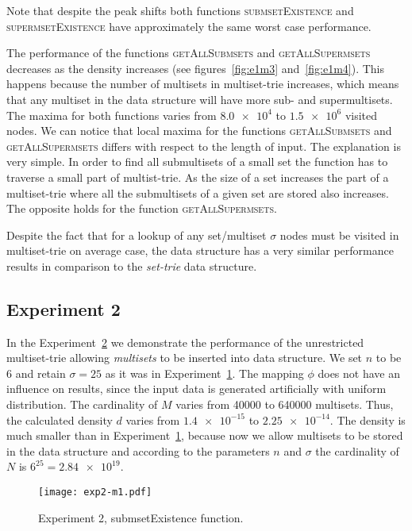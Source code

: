 Note that despite the peak shifts both functions \textsc{submsetExistence} and 
\textsc{supermsetExistence} have approximately the same worst case performance. 

The performance of the functions \textsc{getAllSubmsets} and \textsc{getAllSupermsets} 
decreases as the density increases (see figures~\ref{fig:e1m3} and~\ref{fig:e1m4}). 
This happens because the number of multisets in multiset-trie increases, which means 
that any multiset in the data structure will have more sub- and supermultisets. 
The maxima for both functions varies from $\num{8.0e4}$ to $\num{1.5e6}$ visited nodes. 
We can notice that local maxima for the functions \textsc{getAllSubmsets} and 
\textsc{getAllSupermsets} differs with respect to the length of input. The 
explanation is very simple. In order to find all submultisets of a small set the 
function has to traverse a small part of multist-trie. As the size of a set 
increases the part of a multiset-trie where all the submultisets of a given set 
are stored also increases. The opposite holds for the function 
\textsc{getAllSupermsets}.


Despite the fact that for a lookup of any set/multiset $\sigma$ nodes must be visited 
in multiset-trie on average case, the data structure has a very similar performance 
results in comparison to the \emph{set-trie} data structure.

\subsection{Experiment 2} \label{s:exp2}
In the Experiment~\hyperref[s:exp2]{2} we demonstrate the performance of 
the unrestricted multiset-trie allowing \emph{multisets} to be inserted into data structure. 
We set $n$ to be 6 and retain $\sigma = 25$ as it was in Experiment~\hyperref[s:exp1]{1}. 
The mapping $\phi$ does not have an influence on results, since the input 
data is generated artificially with uniform distribution. The cardinality of $M$ 
varies from 40000 to 640000 multisets. Thus, the calculated density $d$ varies 
from $\num{1.4e-15}$ to $\num{2.25e-14}.$ The density is much smaller than 
in Experiment~\hyperref[s:exp1]{1}, because now we allow multisets to be stored 
in the data structure and according to the parameters $n$ and $\sigma$ the 
cardinality of $N$ is $6^{25} = \num{2.84e19}.$

\begin{figure}
\center
\texttt{[image: exp2-m1.pdf]}
\caption{Experiment 2, submsetExistence function.}
\label{fig:e2m1}
\end{figure}

